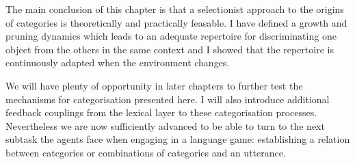 The main conclusion of this chapter is that a selectionist
approach to the origins of categories
is theoretically and practically feasable. I have 
defined a growth and pruning dynamics which leads to 
an adequate repertoire for 
discriminating one object from the others in the 
same context and I showed that the repertoire is
continuously adapted when the environment changes. 

We will have plenty of opportunity in later chapters
to further test the mechanisms for categorisation 
presented here. I will also introduce 
additional feedback couplings from the lexical 
layer to these categorisation processes. Nevertheless
we are now sufficiently advanced to be able to
turn to the next subtask the agents face when 
engaging in a language game: establishing a relation
between categories or combinations of categories and 
an utterance. 


